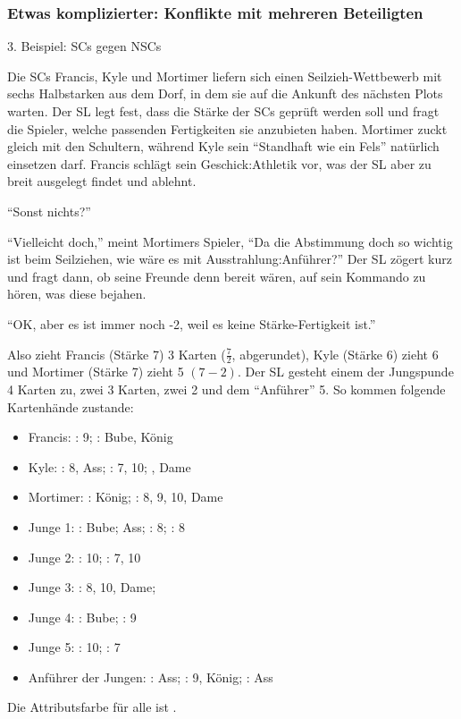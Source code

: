\subsubsection {Etwas komplizierter: Konflikte mit mehreren Beteiligten}

3. Beispiel: SCs gegen NSCs

Die SCs Francis, Kyle und Mortimer liefern sich einen Seilzieh-Wettbewerb mit sechs Halbstarken aus dem Dorf, in dem sie auf die Ankunft des nächsten Plots warten. Der SL legt fest, dass die Stärke der SCs geprüft werden soll und fragt die Spieler, welche passenden Fertigkeiten sie anzubieten haben. Mortimer zuckt gleich mit den Schultern, während Kyle sein "`Standhaft wie ein Fels"' natürlich einsetzen darf. Francis schlägt sein Geschick:Athletik vor, was der SL aber zu breit ausgelegt findet und ablehnt.

"`Sonst nichts?"'

"`Vielleicht doch,"' meint Mortimers Spieler, "`Da die Abstimmung doch so wichtig ist beim Seilziehen, wie wäre es mit Ausstrahlung:Anführer?"'
Der SL zögert kurz und fragt dann, ob seine Freunde denn bereit wären, auf sein Kommando zu hören, was diese bejahen.

"`OK, aber es ist immer noch -2, weil es keine Stärke-Fertigkeit ist."'

Also zieht Francis (Stärke 7) 3 Karten (\(\frac{7}{2}\), abgerundet), Kyle (Stärke 6) zieht 6 und Mortimer (Stärke 7) zieht 5 \((7 - 2)\).
Der SL gesteht einem der Jungspunde 4 Karten zu, zwei 3 Karten, zwei 2 und dem "`Anführer"' 5.
So kommen folgende Kartenhände zustande:
\begin {itemize}
\item Francis: \herz: 9; \pik: Bube, König
\item Kyle: \karo: 8, Ass; \pik: 7, 10; , Dame
\item Mortimer: \herz: König; \kreuz: 8, 9, 10, Dame
\item Junge 1: \herz: Bube; Ass; \karo: 8; \pik: 8
\item Junge 2: \pik: 10; \kreuz: 7, 10
\item Junge 3: \herz: 8, 10, Dame;
\item Junge 4: \pik: Bube; \kreuz: 9
\item Junge 5: \karo: 10; \pik: 7
\item Anführer der Jungen: \herz: Ass; \karo: 9, König; \kreuz: Ass
\end {itemize}
Die Attributsfarbe für alle ist \kreuz.

